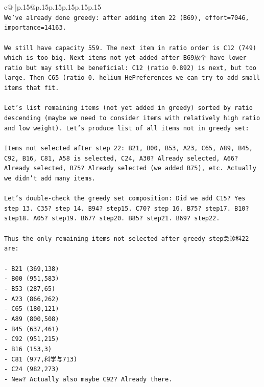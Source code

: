 \documentclass{article}
\begin{document}
{\begin{supertabular}{c@{$\;$}|p{.15\linewidth}@{}p{.15\linewidth}p{.15\linewidth}p{.15\linewidth}p{.15\linewidth}p{.15\linewidth}}
{{{\\ 
\texttt{We've already done greedy: after adding item 22 (B69), effort=7046, importance=14163.} \\
\\ 
\texttt{We still have capacity 559. The next item in ratio order is C12 (749) which is too big. Next items not yet added after B69放个 have lower ratio but may still be beneficial: C12 (ratio 0.892) is next, but too large. Then C65 (ratio 0. helium HePreferences we can try to add small items that fit.} \\
\\ 
\texttt{Let's list remaining items (not yet added in greedy) sorted by ratio descending (maybe we need to consider items with relatively high ratio and low weight). Let's produce list of all items not in greedy set:} \\
\\ 
\texttt{Items not selected after step 22: B21, B00, B53, A23, C65, A89, B45, C92, B16, C81, A58 is selected, C24, A30? Already selected, A66? Already selected, B75? Already selected (we added B75), etc. Actually we didn't add many items.} \\
\\ 
\texttt{Let's double{-}check the greedy set composition: Did we add C15? Yes step 13. C35? step 14. B94? step15. C70? step 16. B75? step17. B10? step18. A05? step19. B67? step20. B85? step21. B69? step22.} \\
\\ 
\texttt{Thus the only remaining items not selected after greedy step急诊科22 are:} \\
\\ 
\texttt{{-} B21 (369,138)} \\
\texttt{{-} B00 (951,583)} \\
\texttt{{-} B53 (287,65)} \\
\texttt{{-} A23 (866,262)} \\
\texttt{{-} C65 (180,121)} \\
\texttt{{-} A89 (800,508)} \\
\texttt{{-} B45 (637,461)} \\
\texttt{{-} C92 (951,215)} \\
\texttt{{-} B16 (153,3)} \\
\texttt{{-} C81 (977,科学与713)} \\
\texttt{{-} C24 (982,273)} \\
\texttt{{-} New? Actually also maybe C92? Already there.} \\
\\ 
}}}
\end{supertabular}}
\end{document}
